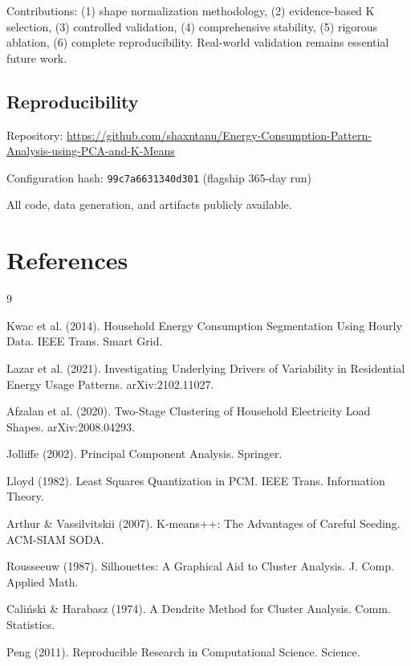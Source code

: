 \documentclass[11pt,a4paper]{article}
\begin{document}
Contributions: (1) shape normalization methodology, (2) evidence-based K selection, (3) controlled validation, (4) comprehensive stability, (5) rigorous ablation, (6) complete reproducibility. Real-world validation remains essential future work.

\subsection{Reproducibility}

Repository: \url{https://github.com/shaxntanu/Energy-Consumption-Pattern-Analysis-using-PCA-and-K-Means}

Configuration hash: \texttt{99c7a6631340d301} (flagship 365-day run)

All code, data generation, and artifacts publicly available.

\section*{References}

\begin{thebibliography}{9}

 Kwac et al. (2014). Household Energy Consumption Segmentation Using Hourly Data. IEEE Trans. Smart Grid.

 Lazar et al. (2021). Investigating Underlying Drivers of Variability in Residential Energy Usage Patterns. arXiv:2102.11027.

 Afzalan et al. (2020). Two-Stage Clustering of Household Electricity Load Shapes. arXiv:2008.04293.

 Jolliffe (2002). Principal Component Analysis. Springer.

 Lloyd (1982). Least Squares Quantization in PCM. IEEE Trans. Information Theory.

 Arthur \& Vassilvitskii (2007). K-means++: The Advantages of Careful Seeding. ACM-SIAM SODA.

 Rousseeuw (1987). Silhouettes: A Graphical Aid to Cluster Analysis. J. Comp. Applied Math.

 Caliński \& Harabasz (1974). A Dendrite Method for Cluster Analysis. Comm. Statistics.

 Peng (2011). Reproducible Research in Computational Science. Science.

\end{thebibliography}

\end{document}
